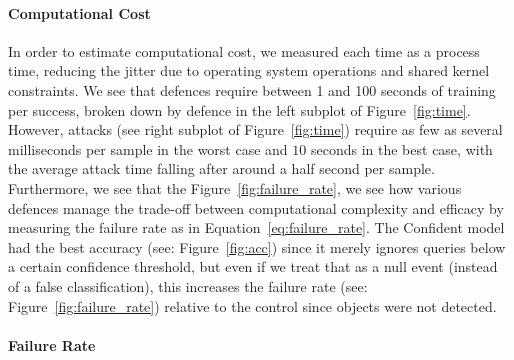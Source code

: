 \paragraph{Computational Cost}

 In order to estimate computational cost, we measured each time as a process time, reducing the jitter due to operating system operations and shared kernel constraints.
We see that defences require between 1 and 100 seconds of training per success, broken down by defence in the left subplot of Figure~\ref{fig:time}.
However, attacks (see right subplot of Figure~\ref{fig:time}) require as few as several milliseconds per sample in the worst case and $10$ seconds in the best case, with the average attack time falling after around a half second per sample.
Furthermore, we see that the  Figure~\ref{fig:failure_rate}, we see how various defences manage the trade-off between computational complexity and efficacy by measuring the failure rate as in Equation~\ref{eq:failure_rate}.
The Confident model had the best accuracy (see: Figure~\ref{fig:acc}) since it merely ignores queries below a certain confidence threshold, but even if we treat that as a null event (instead of a false classification), this increases the failure rate (see: Figure~\ref{fig:failure_rate}) relative to the control since objects were not detected.


\paragraph{Failure Rate}

